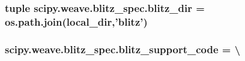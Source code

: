 \subsubsection[{blitz\+\_\+dir}]{\setlength{\rightskip}{0pt plus 5cm}tuple scipy.\+weave.\+blitz\+\_\+spec.\+blitz\+\_\+dir = os.\+path.\+join(local\+\_\+dir,'blitz')}\label{namespacescipy_1_1weave_1_1blitz__spec_ae95e0b60b15e921a6da4621f73e367b4}
\hypertarget{namespacescipy_1_1weave_1_1blitz__spec_a1107beb1ca8f57abb023ac5462e358b0}{}
\subsubsection[{blitz\+\_\+support\+\_\+code}]{\setlength{\rightskip}{0pt plus 5cm}scipy.\+weave.\+blitz\+\_\+spec.\+blitz\+\_\+support\+\_\+code = \textbackslash{}}\label{namespacescipy_1_1weave_1_1blitz__spec_a1107beb1ca8f57abb023ac5462e358b0}
